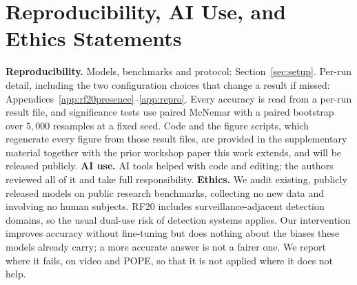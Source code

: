 \section*{Reproducibility, AI Use, and Ethics Statements}
\textbf{Reproducibility.}
Models, benchmarks and protocol: Section~\ref{sec:setup}. Per-run detail,
including the two configuration choices that change a result if missed:
Appendices~\ref{app:rf20presence}--\ref{app:repro}. Every accuracy is read from
a per-run result file, and significance tests use paired McNemar with a paired
bootstrap over $5{,}000$ resamples at a fixed seed. Code and the figure scripts,
which regenerate every figure from those result files, are provided in the
supplementary material together with the prior workshop paper this work extends,
and will be released publicly.
%
\textbf{AI use.}
AI tools helped with code and editing; the authors reviewed all of it and take
full responsibility.
%
\textbf{Ethics.}
We audit existing, publicly released models on public research benchmarks,
collecting no new data and involving no human subjects. RF20 includes
surveillance-adjacent detection domains, so the usual dual-use risk of detection
systems applies. Our intervention improves accuracy without fine-tuning but does
nothing about the biases these models already carry; a more accurate answer is
not a fairer one. We report where it fails, on video and POPE, so that it is not
applied where it does not help.
